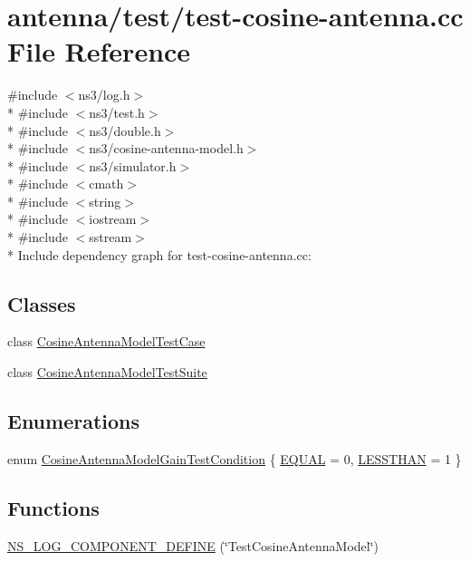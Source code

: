 \hypertarget{test-cosine-antenna_8cc}{}\section{antenna/test/test-\/cosine-\/antenna.cc File Reference}
\label{test-cosine-antenna_8cc}
{\ttfamily \#include $<$ns3/log.\+h$>$}\\*
{\ttfamily \#include $<$ns3/test.\+h$>$}\\*
{\ttfamily \#include $<$ns3/double.\+h$>$}\\*
{\ttfamily \#include $<$ns3/cosine-\/antenna-\/model.\+h$>$}\\*
{\ttfamily \#include $<$ns3/simulator.\+h$>$}\\*
{\ttfamily \#include $<$cmath$>$}\\*
{\ttfamily \#include $<$string$>$}\\*
{\ttfamily \#include $<$iostream$>$}\\*
{\ttfamily \#include $<$sstream$>$}\\*
Include dependency graph for test-\/cosine-\/antenna.cc\+:
\subsection*{Classes}
\begin{DoxyCompactItemize}
\item 
class \hyperlink{classCosineAntennaModelTestCase}{Cosine\+Antenna\+Model\+Test\+Case}
\item 
class \hyperlink{classCosineAntennaModelTestSuite}{Cosine\+Antenna\+Model\+Test\+Suite}
\end{DoxyCompactItemize}
\subsection*{Enumerations}
\begin{DoxyCompactItemize}
\item 
enum \hyperlink{test-cosine-antenna_8cc_ae8bcd1a3938ab2748667be8c74661c05}{Cosine\+Antenna\+Model\+Gain\+Test\+Condition} \{ \hyperlink{test-cosine-antenna_8cc_ae8bcd1a3938ab2748667be8c74661c05a59a84258a4cb9025b567ee5139455029}{E\+Q\+U\+AL} = 0, 
\hyperlink{test-cosine-antenna_8cc_ae8bcd1a3938ab2748667be8c74661c05a8ce9b27601f653ddc597894a1018c55d}{L\+E\+S\+S\+T\+H\+AN} = 1
 \}
\end{DoxyCompactItemize}
\subsection*{Functions}
\begin{DoxyCompactItemize}
\item 
\hyperlink{test-cosine-antenna_8cc_ac75c9ce678401123f642452ab21b2036}{N\+S\+\_\+\+L\+O\+G\+\_\+\+C\+O\+M\+P\+O\+N\+E\+N\+T\+\_\+\+D\+E\+F\+I\+NE} (\char`\"{}Test\+Cosine\+Antenna\+Model\char`\"{})
\end{DoxyCompactItemize}
